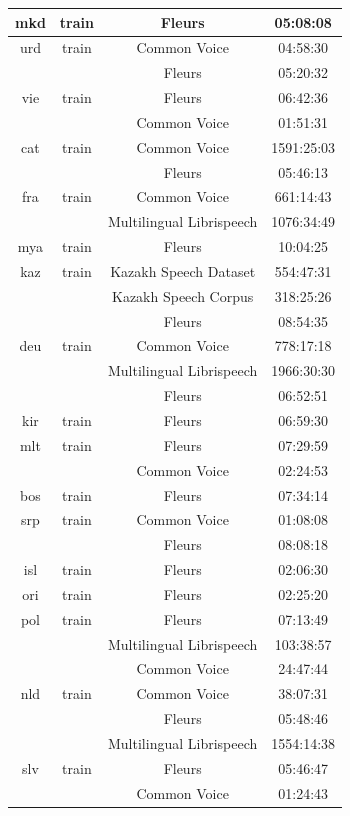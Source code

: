 \begin{longtable}{cccc}
mkd & train & Fleurs & 05:08:08 \\  \midrule
urd & train & Common Voice & 04:58:30 \\ 
 & & Fleurs & 05:20:32 \\ \midrule
vie & train & Fleurs & 06:42:36 \\ 
 & & Common Voice & 01:51:31 \\ \midrule
cat & train & Common Voice & 1591:25:03 \\ 
 & & Fleurs & 05:46:13 \\  \midrule
fra & train & Common Voice & 661:14:43 \\ 
 & & Multilingual Librispeech & 1076:34:49 \\ \midrule
mya & train & Fleurs & 10:04:25 \\  \midrule
kaz & train & Kazakh Speech Dataset  & 554:47:31 \\ 
 & & Kazakh Speech Corpus & 318:25:26 \\ 
 & & Fleurs & 08:54:35 \\  \midrule
deu & train & Common Voice & 778:17:18 \\ 
 & & Multilingual Librispeech & 1966:30:30 \\ 
 & & Fleurs & 06:52:51 \\  \midrule
kir & train & Fleurs & 06:59:30 \\ \midrule
mlt & train & Fleurs & 07:29:59 \\ 
 & & Common Voice & 02:24:53 \\  \midrule
bos & train & Fleurs & 07:34:14 \\  \midrule
srp & train & Common Voice & 01:08:08 \\ 
 & & Fleurs & 08:08:18 \\  \midrule
isl & train & Fleurs & 02:06:30 \\  \midrule
ori & train & Fleurs & 02:25:20 \\ \midrule
pol & train & Fleurs & 07:13:49 \\ 
 & & Multilingual Librispeech & 103:38:57 \\ 
 & & Common Voice & 24:47:44 \\ \midrule
nld & train & Common Voice & 38:07:31 \\ 
 & & Fleurs & 05:48:46 \\ 
 & & Multilingual Librispeech & 1554:14:38 \\ \midrule
slv & train & Fleurs & 05:46:47 \\ 
 & & Common Voice & 01:24:43 \\ \midrule

\end{longtable}
